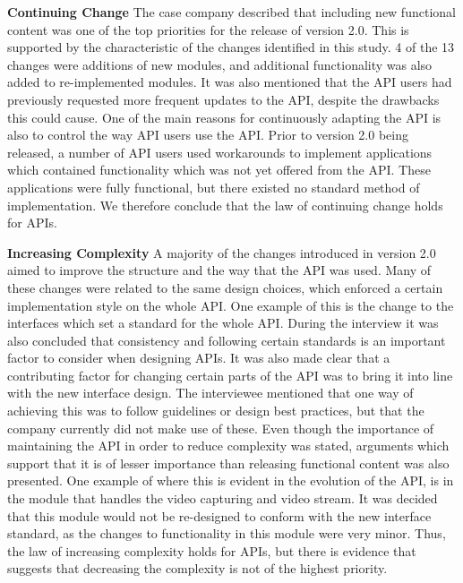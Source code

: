 \documentclass{sig-alternate}
\begin{document}
\smallskip \noindent
\textbf{Continuing Change} 
The case company described that including new functional content was one of the top priorities for the release of version 2.0. This is supported by the characteristic of the changes identified in this study. 4 of the 13 changes were additions of new modules, and additional functionality was also added to re-implemented modules. It was also mentioned that the API users had previously requested more frequent updates to the API, despite the drawbacks this could cause. One of the main reasons for continuously adapting the API is also to control the way API users use the API. Prior to version 2.0 being released, a number of API users used workarounds to implement applications which contained functionality which was not yet offered from the API. These applications were fully functional, but there existed no standard method of implementation. We therefore conclude that the law of continuing change holds for APIs. 

\smallskip \noindent
\textbf{Increasing Complexity} \label{sec:law2} 
A majority of the changes introduced in version 2.0 aimed to improve the structure and the way that the API was used. Many of these changes were related to the same design choices, which enforced a certain implementation style on the whole API. One example of this is the change to the interfaces which set a standard for the whole API. During the interview it was also concluded that consistency and following certain standards is an important factor to consider when designing APIs. It was also made clear that a contributing factor for changing certain parts of the API was to bring it into line with the new interface design. The interviewee mentioned that one way of achieving this was to follow guidelines or design best practices, but that the company currently did not make use of these. Even though the importance of maintaining the API in order to reduce complexity was stated, arguments which support that it is of lesser importance than releasing functional content was also presented. One example of where this is evident in the evolution of the API, is in the module that handles the video capturing and video stream. It was decided that this module would not be re-designed to conform with the new interface standard, as the changes to functionality in this module were very minor. Thus, the law of increasing complexity holds for APIs, but there is evidence that suggests that decreasing the complexity is not of the highest priority. 
\end{document}
